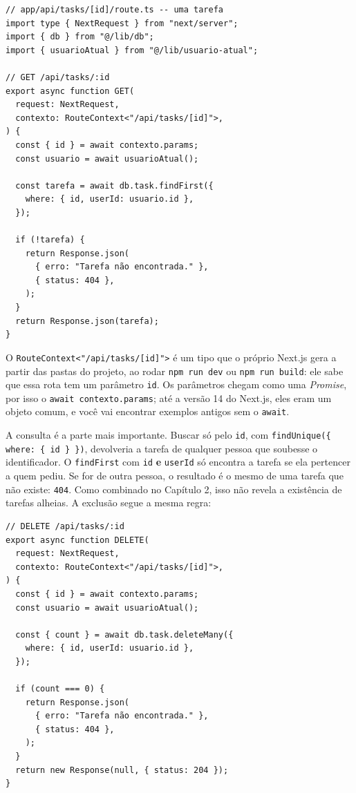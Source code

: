 \begin{codigo}
\begin{Verbatim}[breaklines=true, breaksymbolleft={}, fontsize=\footnotesize]
// app/api/tasks/[id]/route.ts -- uma tarefa
import type { NextRequest } from "next/server";
import { db } from "@/lib/db";
import { usuarioAtual } from "@/lib/usuario-atual";

// GET /api/tasks/:id
export async function GET(
  request: NextRequest,
  contexto: RouteContext<"/api/tasks/[id]">,
) {
  const { id } = await contexto.params;
  const usuario = await usuarioAtual();

  const tarefa = await db.task.findFirst({
    where: { id, userId: usuario.id },
  });

  if (!tarefa) {
    return Response.json(
      { erro: "Tarefa não encontrada." },
      { status: 404 },
    );
  }
  return Response.json(tarefa);
}
\end{Verbatim}
\end{codigo}

O \texttt{RouteContext<"/api/tasks/[id]">} é um tipo que o próprio Next.js gera a partir das pastas do projeto, ao rodar \texttt{npm run dev} ou \texttt{npm run build}: ele sabe que essa rota tem um parâmetro \texttt{id}. Os parâmetros chegam como uma \textit{Promise}, por isso o \texttt{await contexto.params}; até a versão 14 do Next.js, eles eram um objeto comum, e você vai encontrar exemplos antigos sem o \texttt{await}.

A consulta é a parte mais importante. Buscar só pelo \texttt{id}, com \texttt{findUnique(\{ where: \{ id \} \})}, devolveria a tarefa de qualquer pessoa que soubesse o identificador. O \texttt{findFirst} com \texttt{id} \textbf{e} \texttt{userId} só encontra a tarefa se ela pertencer a quem pediu. Se for de outra pessoa, o resultado é o mesmo de uma tarefa que não existe: \texttt{404}. Como combinado no Capítulo 2, isso não revela a existência de tarefas alheias. A exclusão segue a mesma regra:

\begin{codigo}
\begin{Verbatim}[breaklines=true, breaksymbolleft={}, fontsize=\footnotesize]
// DELETE /api/tasks/:id
export async function DELETE(
  request: NextRequest,
  contexto: RouteContext<"/api/tasks/[id]">,
) {
  const { id } = await contexto.params;
  const usuario = await usuarioAtual();

  const { count } = await db.task.deleteMany({
    where: { id, userId: usuario.id },
  });

  if (count === 0) {
    return Response.json(
      { erro: "Tarefa não encontrada." },
      { status: 404 },
    );
  }
  return new Response(null, { status: 204 });
}
\end{Verbatim}
\end{codigo}

